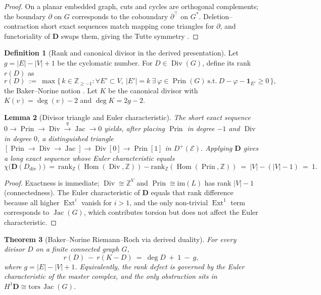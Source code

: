 \documentclass[12pt]{article}
\DeclareMathOperator{\Div}{Div}
\DeclareMathOperator{\Prin}{Prin}
\DeclareMathOperator{\Jac}{Jac}
\newcommand{\E}{\mathcal{E}}
\newcommand{\ZZ}{\mathbb{Z}}
\newcommand{\Hom}{\operatorname{Hom}}
\newcommand{\Ext}{\operatorname{Ext}}
\newcommand{\Dplus}{D^{+}}
\theoremstyle{plain}
\newtheorem{theorem}{Theorem}[section]
\newtheorem{lemma}[theorem]{Lemma}
\theoremstyle{definition}
\newtheorem{definition}[theorem]{Definition}
\theoremstyle{remark}
\numberwithin{equation}{section}
\begin{document}
\begin{proof}
On a planar embedded graph, cuts and cycles are orthogonal complements; the boundary $\partial$ on $G$ corresponds to the coboundary $\partial^\top$ on $G^\ast$. Deletion–contraction short exact sequences match mapping cone triangles for $\partial$, and functoriality of $\mathbf D$ swaps them, giving the Tutte symmetry \cite{Biggs1993}.
\end{proof}

\begin{definition}[Rank and canonical divisor in the derived presentation]
Let $g=|E|-|V|+1$ be the cyclomatic number. For $D\in\Div(G)$, define its rank $r(D)$ as
\[
r(D)\ :=\ \max\{\,k\in\ZZ_{\ge -1}: \forall E'\subset V,\ |E'|=k\ \exists\ \varphi\in\Prin(G)\ \text{s.t.}\ D-\varphi - \mathbf 1_{E'}\ge 0\,\},
\]
the Baker–Norine notion \cite{BakerNorine2007}. Let $K$ be the canonical divisor with $K(v)=\deg(v)-2$ and $\deg K=2g-2$.
\end{definition}

\begin{lemma}[Divisor triangle and Euler characteristic]\label{lem:triangle}
The short exact sequence $0\to \Prin\to \Div\xrightarrow{q}\Jac\to 0$ yields, after placing $\Prin$ in degree $-1$ and $\Div$ in degree $0$, a distinguished triangle $[\Prin\to \Div\to \Jac]\to \Div[0]\to \Prin[1]$ in $\Dplus(\E)$. Applying $\mathbf D$ gives a long exact sequence whose Euler characteristic equals
\[
\chi\bigl(\mathbf D(D_{\mathrm{div}})\bigr)\ =\ \mathrm{rank}_{\ZZ}(\Hom(\Div,\ZZ))-\mathrm{rank}_{\ZZ}(\Hom(\Prin,\ZZ))\ =\ |V|- (|V|-1)\ =\ 1.
\]
\end{lemma}

\begin{proof}
Exactness is immediate; $\Div\cong \ZZ^{V}$ and $\Prin\cong \mathrm{im}(L)$ has rank $|V|-1$ (connectedness). The Euler characteristic of $\mathbf D$ equals that rank difference because all higher $\Ext^i$ vanish for $i>1$, and the only non-trivial $\Ext^1$
term corresponds to $\Jac(G)$, which contributes torsion but does not
affect the Euler characteristic.
\end{proof}

\begin{theorem}[Baker–Norine Riemann–Roch via derived duality]\label{thm:RR}
For every divisor $D$ on a finite connected graph $G$,
\[
r(D)\ -\ r(K-D)\ =\ \deg D\ +\ 1\ -\ g,
\]
where $g=|E|-|V|+1$. Equivalently, the rank defect is governed by the Euler characteristic of the master complex, and the only obstruction sits in $H^1\mathbf D\cong \mathrm{tors}\,\Jac(G)$.
\end{theorem}
\end{document}
